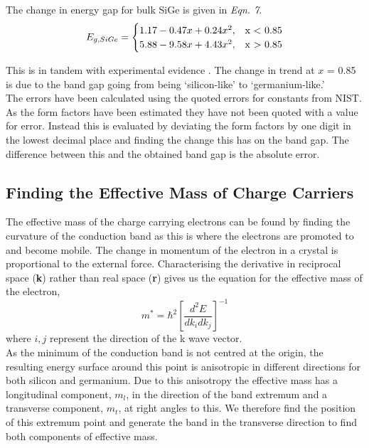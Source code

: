 \documentclass[10pt, twocolumn]{revtex4}    %
\begin{document}
The change in energy gap for bulk SiGe is given in \textit{Eqn. 7}.
\begin{equation}
E_{g,SiGe} =
    \begin{cases}
      1.17 - 0.47x + 0.24x^2, & \text{x \textless \  0.85}\\
      5.88 - 9.58x + 4.43x^2, & \text{x \textgreater \ 0.85}\\
    \end{cases}
\end{equation}

This is in tandem with experimental evidence \cite{ref12}. The change in trend at $x$ = 0.85 is due to the band gap going from being `silicon-like' to  `germanium-like.' \\


The errors have been calculated using the quoted errors for constants from NIST. As the form factors have been estimated they have not been quoted with a value for error. Instead this is evaluated by deviating the form factors by one digit in the lowest decimal place and finding the change this has on the band gap. The difference between this and the obtained band gap is the absolute error.

\subsection{Finding the Effective Mass of Charge Carriers}

The effective mass of the charge carrying electrons can be found by finding the curvature of the conduction band as this is where the electrons are promoted to and become mobile.
The change in momentum of the electron in a crystal is proportional to the external force. Characterising the derivative in reciprocal space (\textbf{k}) rather than real space (\textbf{r}) gives us the equation for the effective mass of the electron, \cite{ref13}
\begin{equation}
m^* = \hbar^2 \left[ \frac{d^2E}{dk_i dk_j}\right]^{-1}
\end{equation}
where $i,j$ represent the direction of the k wave vector. \\


As the minimum of the conduction band is not centred at the origin, the resulting energy surface around this point  is anisotropic in different directions for both silicon and germanium. Due to this anisotropy the effective mass has a longitudinal component, $m_l$, in the direction of the band extremum and a transverse component, $m_t$, at right angles to this. We therefore find the position of this extremum point and generate the band in the transverse direction to find both components of effective mass. \\
\end{document}
